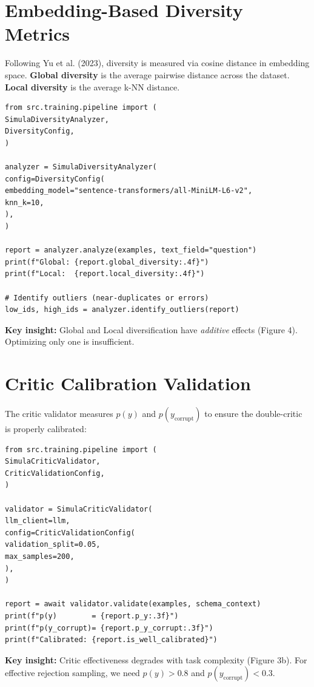 \documentclass[12pt,a4paper,twoside]{report}
\begin{document}
\section{Embedding-Based Diversity Metrics}

Following Yu et al. (2023), diversity is measured via cosine distance in embedding
space. \textbf{Global diversity} is the average pairwise distance across the dataset.
\textbf{Local diversity} is the average k-NN distance.

\begin{lstlisting}[language=jsonx,caption={Diversity analyzer usage}]
from src.training.pipeline import (
SimulaDiversityAnalyzer,
DiversityConfig,
)

analyzer = SimulaDiversityAnalyzer(
config=DiversityConfig(
embedding_model="sentence-transformers/all-MiniLM-L6-v2",
knn_k=10,
),
)

report = analyzer.analyze(examples, text_field="question")
print(f"Global: {report.global_diversity:.4f}")
print(f"Local:  {report.local_diversity:.4f}")

# Identify outliers (near-duplicates or errors)
low_ids, high_ids = analyzer.identify_outliers(report)
\end{lstlisting}

\textbf{Key insight:} Global and Local diversification have \emph{additive} effects
(Figure 4). Optimizing only one is insufficient.

\section{Critic Calibration Validation}

The critic validator measures $p(y)$ and $p(y_{\text{corrupt}})$ to ensure the
double-critic is properly calibrated:

\begin{lstlisting}[language=jsonx,caption={Critic validator usage}]
from src.training.pipeline import (
SimulaCriticValidator,
CriticValidationConfig,
)

validator = SimulaCriticValidator(
llm_client=llm,
config=CriticValidationConfig(
validation_split=0.05,
max_samples=200,
),
)

report = await validator.validate(examples, schema_context)
print(f"p(y)        = {report.p_y:.3f}")
print(f"p(y_corrupt)= {report.p_y_corrupt:.3f}")
print(f"Calibrated: {report.is_well_calibrated}")
\end{lstlisting}

\textbf{Key insight:} Critic effectiveness degrades with task complexity (Figure 3b).
For effective rejection sampling, we need $p(y) > 0.8$ and $p(y_{\text{corrupt}}) < 0.3$.
\end{document}

